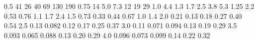 0.5  41  26  40  69  130  190 
0.75  14  5.0  7.3  12  19  29 
1.0  4.4  1.3  1.7  2.5  3.8  5.3 
1.25  2.2  0.53  0.76  1.1  1.7  2.4 
1.5  0.73  0.33  0.44  0.67  1.0  1.4 
2.0  0.21  0.13  0.18  0.27  0.40  0.54 
2.5  0.13  0.082  0.12  0.17  0.25  0.37 
3.0  0.11  0.071  0.094  0.13  0.19  0.29 
3.5  0.093  0.065  0.088  0.13  0.20  0.29 
4.0  0.096  0.073  0.099  0.14  0.22  0.32 

